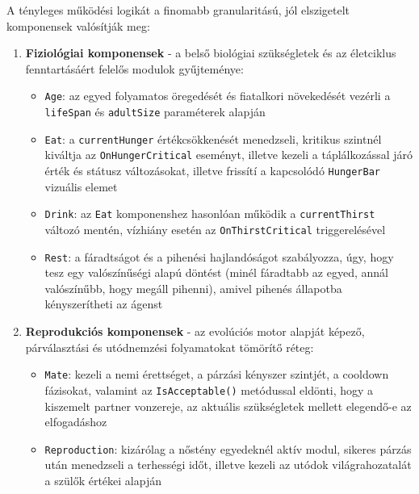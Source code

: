 A tényleges működési logikát a finomabb granularitású, jól elszigetelt komponensek valósítják meg:
\begin{enumerate}
    \item \textbf{Fiziológiai komponensek} - a belső biológiai szükségletek és az életciklus fenntartásáért felelős modulok gyűjteménye:
    \label{item:fiziologia_enum}
    \begin{itemize}
        \item \texttt{Age}: az egyed folyamatos öregedését és fiatalkori növekedését vezérli a \texttt{lifeSpan} és \texttt{adultSize} paraméterek alapján
        \item \texttt{Eat}: a \texttt{currentHunger} értékcsökkenését menedzseli, kritikus szintnél kiváltja az \texttt{OnHungerCritical} eseményt, illetve kezeli a táplálkozással járó érték és státusz változásokat, illetve frissítí a kapcsolódó \texttt{HungerBar} vizuális elemet
        \item \texttt{Drink}: az \texttt{Eat} komponenshez hasonlóan működik a \texttt{currentThirst} változó mentén, vízhiány esetén az \texttt{OnThirstCritical} triggerelésével
        \item \texttt{Rest}: a fáradtságot és a pihenési hajlandóságot szabályozza, úgy, hogy tesz egy valószínűségi alapú döntést (minél fáradtabb az egyed, annál valószínűbb, hogy megáll pihenni), amivel pihenés állapotba kényszerítheti az ágenst
    \end{itemize}

    \item \textbf{Reprodukciós komponensek} - az evolúciós motor alapját képező, párválasztási és utódnemzési folyamatokat tömörítő réteg:
    \begin{itemize}
        \item \texttt{Mate}: kezeli a nemi érettséget, a párzási kényszer szintjét, a cooldown fázisokat, valamint az \texttt{IsAcceptable()} metódussal eldönti, hogy a kiszemelt partner vonzereje, az aktuális szükségletek mellett elegendő-e az elfogadáshoz
        \item \texttt{Reproduction}: kizárólag a nőstény egyedeknél aktív modul, sikeres párzás után menedzseli a terhességi időt, illetve kezeli az utódok világrahozatalát a szülők értékei alapján
    \end{itemize}


\end{enumerate}

